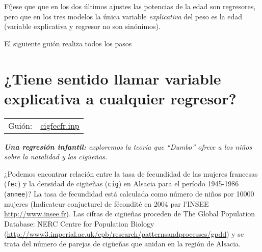 \documentclass[11pt]{article}
\begin{document}
Fíjese que que en los dos últimos ajustes las potencias de la edad son
regresores, pero que en los tres modelos la única variable
\emph{explicativa} del peso es la edad (variable explicativa y regresor no
son sinónimos).

El siguiente guión realiza todos los pasos
{\vspace{3pt} \color{gray!70!black}
}

\vspace{12pt}



\clearpage


\section{¿Tiene sentido llamar variable explicativa a cualquier regresor?}
\label{sec:org7980e6d}
\begin{center}
\begin{tabular}{ll}
Guión: & \href{https://github.com/mbujosab/Ectr/tree/master/Practicas/Gretl/scripts/cigfecfr.inp}{cigfecfr.inp}\\[0pt]
\end{tabular}
\end{center}

\emph{\textbf{Una regresión infantil:} exploremos la teoría que ``Dumbo''
   ofrece a los niños sobre la natalidad y las cigüeñas.}

¿Podemos encontrar relación entre la tasa de fecundidad de las
mujeres francesas (\texttt{fec}) y la densidad de cigüeñas (\texttt{cig}) en
Alsacia para el período 1945-1986 (\texttt{annee})? La tasa de fecundidad
está calculada como número de niños por 10000 mujeres (Indicateur
conjucturel de fécondité en 2004 par l'INSEE \url{http://www.insee.fr}).
Las cifras de cigüeñas proceden de The Global Population Database:
NERC Centre for Population Biology
(\url{http://www3.imperial.ac.uk/cpb/research/patternsandprocesses/gpdd})
y se trata del número de parejas de cigüeñas que anidan en la
región de Alsacia.
\end{document}
